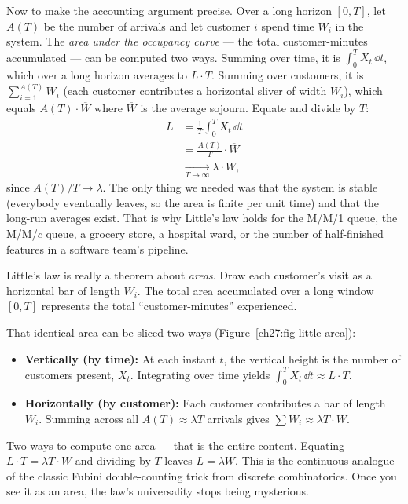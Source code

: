 \begin{whybox}
Now to make the accounting argument precise. Over a long horizon $[0, T]$, let $A(T)$ be the number
of arrivals and let customer $i$ spend time $W_i$ in the system. The \emph{area under the
occupancy curve} --- the total customer-minutes accumulated --- can be computed two ways. Summing
over time, it is $\int_0^T X_t\,\dd t$, which over a long horizon averages to $L \cdot T$. Summing
over customers, it is $\sum_{i=1}^{A(T)} W_i$ (each customer contributes a horizontal sliver of
width $W_i$), which equals $A(T) \cdot \overline{W}$ where $\overline{W}$ is the average sojourn.
Equate and divide by $T$:
\begin{align*}
  L &= \frac{1}{T}\int_0^T X_t\,\dd t \\
    &= \frac{A(T)}{T}\cdot \overline{W} \\
    &\xrightarrow[T \to \infty]{} \lambda \cdot W,
\end{align*}
since $A(T)/T \to \lambda$. The only thing we needed was that the system is stable (everybody
eventually leaves, so the area is finite per unit time) and that the long-run averages exist. That is
why Little's law holds for the M/M/1 queue, the M/M/$c$ queue, a grocery store, a hospital ward, or
the number of half-finished features in a software team's pipeline.
\end{whybox}

\begin{happeningbox}
Little's law is really a theorem about \emph{areas}. Draw each customer's visit as a horizontal bar
of length $W_i$. The total area accumulated over a long window $[0, T]$ represents the total
``customer-minutes'' experienced.

That identical area can be sliced two ways (Figure~\ref{ch27:fig-little-area}):
\begin{itemize}
  \item \textbf{Vertically (by time):} At each instant $t$, the vertical height is the number of
  customers present, $X_t$. Integrating over time yields $\int_0^T X_t\,\dd t \approx L \cdot T$.
  \item \textbf{Horizontally (by customer):} Each customer contributes a bar of length $W_i$.
  Summing across all $A(T) \approx \lambda T$ arrivals gives $\sum W_i \approx \lambda T \cdot W$.
\end{itemize}
Two ways to compute one area --- that is the entire content. Equating $L \cdot T = \lambda T \cdot W$
and dividing by $T$ leaves $L = \lambda W$. This is the continuous analogue of the classic Fubini
double-counting trick from discrete combinatorics. Once you see it as an area, the law's universality
stops being mysterious.
\end{happeningbox}

